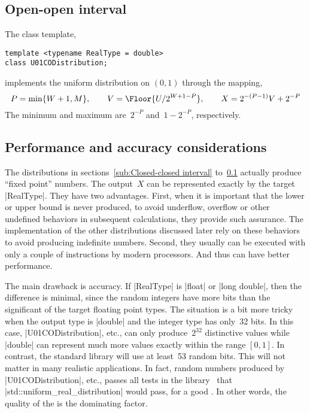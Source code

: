 \subsection{Open-open interval}
\label{sub:Open-open interval}

The class template,
\begin{verbatim}
template <typename RealType = double>
class U01CODistribution;
\end{verbatim}
implements the uniform distribution on $(0, 1)$ through the mapping,
\begin{equation*}
  P = \min\{W + 1, M\},\qquad
  V = \Floor{U / 2^{W + 1 - P}},\qquad
  X = 2^{-(P - 1)} V + 2^{-P}
\end{equation*}
The minimum and maximum are~$2^{-P}$ and~$1 - 2^{-P}$, respectively.

\subsection{Performance and accuracy considerations}
\label{sub:Performance and accuracy considerations}

The distributions in sections~\ref{sub:Closed-closed interval}
to~\ref{sub:Open-open interval} actually produce ``fixed point'' numbers. The
output~$X$ can be represented exactly by the target |RealType|. They have two
advantages. First, when it is important that the lower or upper bound is never
produced, to avoid underflow, overflow or other undefined behaviors in
subsequent calculations, they provide such assurance. The implementation of the
other distributions discussed later rely on these behaviors to avoid producing
indefinite numbers. Second, they usually can be executed with only a couple of
instructions by modern processors. And thus can have better performance.

The main drawback is accuracy. If |RealType| is |float| or |long double|, then
the difference is minimal, since the random integers have more bits than the
significant of the target floating point types. The situation is a bit more
tricky when the output type is |double| and the integer type has only~32 bits.
In this case, |U01CODistribution|, etc., can only produce~$2^{32}$ distinctive
values while |double| can represent much more values exactly within the range
$[0, 1]$. In contrast, the standard library will use at least~53 random bits.
This will not matter in many realistic applications. In fact, random numbers
produced by |U01CODistribution|, etc., passes all tests in the \testu
library~\cite{Lecuyer:2007hv} that |std::uniform_real_distribution| would pass,
for a good \rng. In other words, the quality of the \rng is the dominating
factor.

